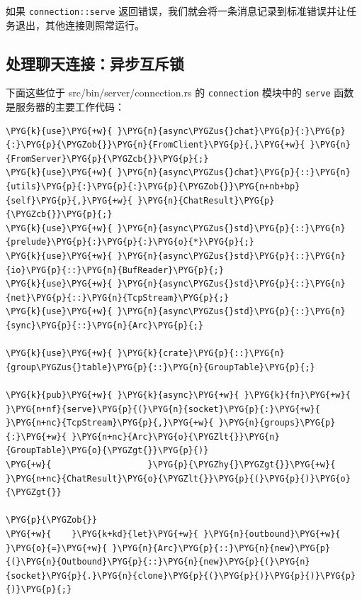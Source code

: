 如果 \texttt{connection::serve} 返回错误，我们就会将一条消息记录到标准错误并让任务退出，其他连接则照常运行。

\subsection{处理聊天连接：异步互斥锁}

下面这些位于 src/bin/server/\allowbreak{}connection.rs 的 \texttt{connection} 模块中的 \texttt{serve} 函数是服务器的主要工作代码：

\begin{Verbatim}[commandchars=\\\{\},breaklines=true,breakanywhere=true,fontsize=\codefont,xleftmargin=17bp]
\PYG{k}{use}\PYG{+w}{ }\PYG{n}{async\PYGZus{}chat}\PYG{p}{:}\PYG{p}{:}\PYG{p}{\PYGZob{}}\PYG{n}{FromClient}\PYG{p}{,}\PYG{+w}{ }\PYG{n}{FromServer}\PYG{p}{\PYGZcb{}}\PYG{p}{;}
\PYG{k}{use}\PYG{+w}{ }\PYG{n}{async\PYGZus{}chat}\PYG{p}{::}\PYG{n}{utils}\PYG{p}{:}\PYG{p}{:}\PYG{p}{\PYGZob{}}\PYG{n+nb+bp}{self}\PYG{p}{,}\PYG{+w}{ }\PYG{n}{ChatResult}\PYG{p}{\PYGZcb{}}\PYG{p}{;}
\PYG{k}{use}\PYG{+w}{ }\PYG{n}{async\PYGZus{}std}\PYG{p}{::}\PYG{n}{prelude}\PYG{p}{:}\PYG{p}{:}\PYG{o}{*}\PYG{p}{;}
\PYG{k}{use}\PYG{+w}{ }\PYG{n}{async\PYGZus{}std}\PYG{p}{::}\PYG{n}{io}\PYG{p}{::}\PYG{n}{BufReader}\PYG{p}{;}
\PYG{k}{use}\PYG{+w}{ }\PYG{n}{async\PYGZus{}std}\PYG{p}{::}\PYG{n}{net}\PYG{p}{::}\PYG{n}{TcpStream}\PYG{p}{;}
\PYG{k}{use}\PYG{+w}{ }\PYG{n}{async\PYGZus{}std}\PYG{p}{::}\PYG{n}{sync}\PYG{p}{::}\PYG{n}{Arc}\PYG{p}{;}

\PYG{k}{use}\PYG{+w}{ }\PYG{k}{crate}\PYG{p}{::}\PYG{n}{group\PYGZus{}table}\PYG{p}{::}\PYG{n}{GroupTable}\PYG{p}{;}

\PYG{k}{pub}\PYG{+w}{ }\PYG{k}{async}\PYG{+w}{ }\PYG{k}{fn}\PYG{+w}{ }\PYG{n+nf}{serve}\PYG{p}{(}\PYG{n}{socket}\PYG{p}{:}\PYG{+w}{ }\PYG{n+nc}{TcpStream}\PYG{p}{,}\PYG{+w}{ }\PYG{n}{groups}\PYG{p}{:}\PYG{+w}{ }\PYG{n+nc}{Arc}\PYG{o}{\PYGZlt{}}\PYG{n}{GroupTable}\PYG{o}{\PYGZgt{}}\PYG{p}{)}
\PYG{+w}{                   }\PYG{p}{\PYGZhy{}\PYGZgt{}}\PYG{+w}{ }\PYG{n+nc}{ChatResult}\PYG{o}{\PYGZlt{}}\PYG{p}{(}\PYG{p}{)}\PYG{o}{\PYGZgt{}}

\PYG{p}{\PYGZob{}}
\PYG{+w}{    }\PYG{k+kd}{let}\PYG{+w}{ }\PYG{n}{outbound}\PYG{+w}{ }\PYG{o}{=}\PYG{+w}{ }\PYG{n}{Arc}\PYG{p}{::}\PYG{n}{new}\PYG{p}{(}\PYG{n}{Outbound}\PYG{p}{::}\PYG{n}{new}\PYG{p}{(}\PYG{n}{socket}\PYG{p}{.}\PYG{n}{clone}\PYG{p}{(}\PYG{p}{)}\PYG{p}{)}\PYG{p}{)}\PYG{p}{;}


\end{Verbatim}

